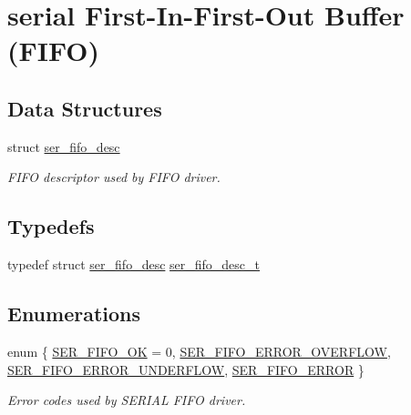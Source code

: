 \hypertarget{group__fifo__group}{}\section{serial First-\/\+In-\/\+First-\/\+Out Buffer (F\+I\+FO)}
\label{group__fifo__group}
\subsection*{Data Structures}
\begin{DoxyCompactItemize}
\item 
struct \mbox{\hyperlink{structser__fifo__desc}{ser\+\_\+fifo\+\_\+desc}}
\begin{DoxyCompactList}\small\item\em F\+I\+FO descriptor used by F\+I\+FO driver. \end{DoxyCompactList}\end{DoxyCompactItemize}
\subsection*{Typedefs}
\begin{DoxyCompactItemize}
\item 
typedef struct \mbox{\hyperlink{structser__fifo__desc}{ser\+\_\+fifo\+\_\+desc}} \mbox{\hyperlink{group__fifo__group_gab18c001ea5c010cc8dfdedb3525f5013}{ser\+\_\+fifo\+\_\+desc\+\_\+t}}
\end{DoxyCompactItemize}
\subsection*{Enumerations}
\begin{DoxyCompactItemize}
\item 
enum \{ \mbox{\hyperlink{group__fifo__group_ggab6753158b7ebbc2bd6601f7f9a02d857a1bb99f1f4efb995d853055f2b828211b}{S\+E\+R\+\_\+\+F\+I\+F\+O\+\_\+\+OK}} = 0, 
\mbox{\hyperlink{group__fifo__group_ggab6753158b7ebbc2bd6601f7f9a02d857a70a699fd8e590acf0a0401d068cde2b1}{S\+E\+R\+\_\+\+F\+I\+F\+O\+\_\+\+E\+R\+R\+O\+R\+\_\+\+O\+V\+E\+R\+F\+L\+OW}}, 
\mbox{\hyperlink{group__fifo__group_ggab6753158b7ebbc2bd6601f7f9a02d857a8081f9c03c40070cc7c561f8e7f6e05c}{S\+E\+R\+\_\+\+F\+I\+F\+O\+\_\+\+E\+R\+R\+O\+R\+\_\+\+U\+N\+D\+E\+R\+F\+L\+OW}}, 
\mbox{\hyperlink{group__fifo__group_ggab6753158b7ebbc2bd6601f7f9a02d857af3c8eb15fe6d85dd497e80e9ce2861d4}{S\+E\+R\+\_\+\+F\+I\+F\+O\+\_\+\+E\+R\+R\+OR}}
 \}
\begin{DoxyCompactList}\small\item\em Error codes used by S\+E\+R\+I\+AL F\+I\+FO driver. \end{DoxyCompactList}\end{DoxyCompactItemize}

